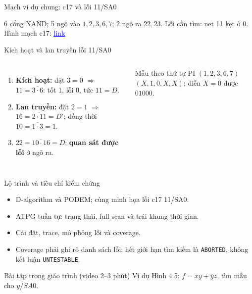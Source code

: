 \begin{frame}{Mạch ví dụ chung: c17 và lỗi 11/SA0}
\centering
\POneValfalse
\resizebox{0.86\textwidth}{!}{\POneCseventeen}
\par\medskip
\small 6 cổng NAND; 5 ngõ vào $1,2,3,6,7$; 2 ngõ ra $22,23$.
Lỗi cần tìm: \textcolor{red!75!black}{net 11 kẹt ở 0}.\\[1mm]
Hình mạch c17: \href{https://share.google/8SGb6lj8d62R1OuPD}{\textcolor{blue}{\underline{link}}}
\end{frame}

\begin{frame}{Kích hoạt và lan truyền lỗi 11/SA0}
\begin{columns}[c,onlytextwidth]
\centering
\POneValtrue
\resizebox{\linewidth}{!}{\POneCseventeen}
\footnotesize
\begin{enumerate}
\item \textbf{Kích hoạt:} đặt $3=0$ \(\Rightarrow\) $11=\overline{3\cdot6}$:
 tốt 1, lỗi 0, tức $11=D$.
\item \textbf{Lan truyền:} đặt $2=1$ \(\Rightarrow\)
 $16=\overline{2\cdot11}=D'$; đồng thời $10=\overline{1\cdot3}=1$.
\item $22=\overline{10\cdot16}=D$: \textbf{quan sát được lỗi} ở ngõ ra.
\end{enumerate}
\begin{block}{Mẫu theo thứ tự PI $(1,2,3,6,7)$}
$(X,1,0,X,X)$; điền $X=0$ được $01000$.
\end{block}
\end{columns}
\end{frame}

\begin{frame}{Lộ trình và tiêu chí kiểm chứng}
\begin{itemize}
\item D-algorithm và PODEM; cùng minh họa lỗi c17 11/SA0.
\item ATPG tuần tự: trạng thái, full scan và trải khung thời gian.
\item Cài đặt, trace, mô phỏng lỗi và coverage.
\item Coverage phải ghi rõ danh sách lỗi; hết giới hạn tìm kiếm là
\texttt{ABORTED}, không kết luận \texttt{UNTESTABLE}.
\end{itemize}
\begin{block}{Bài tập trong giáo trình (video 2--3 phút)}
Ví dụ Hình 4.5: $f=xy+\overline y z$, tìm mẫu cho $y/SA0$.
\end{block}
\end{frame}

